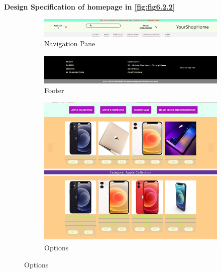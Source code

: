 \newpage
\vspace{4cm}
\textbf{Design Specification of homepage in \ref{fig:fig6.2.2}}\\[2cm]
\begin{figure}[ht]
    \centering
    \begin{subfigure}[b]{\textwidth}
        \centering
        \includegraphics[width=\textwidth]{designs/navigation-pane.png}
        \caption{Navigation Pane}
        \label{fig:6.2.2}
    \end{subfigure}

    \begin{subfigure}[b]{\textwidth}
        \centering
        \includegraphics[width=\textwidth]{designs/footer.png}
        \caption{Footer}
        \label{fig:6.2.3}
    \end{subfigure}
    \begin{subfigure}[b]{\textwidth}
        \centering        \includegraphics[width=\textwidth,height=0.3\textheight]{designs/catagories.png}
        \caption{Options}
        \label{fig:6.2.4}
    \end{subfigure}


\end{figure}
